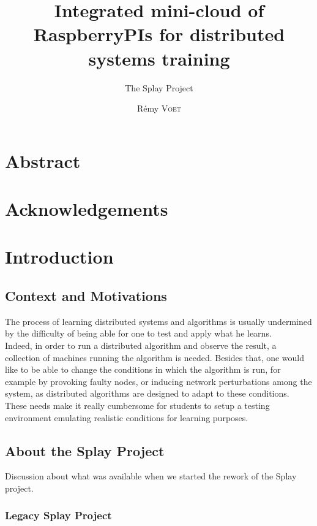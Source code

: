 \documentclass{eplmastersthesis}
\title{Integrated mini-cloud of RaspberryPIs for distributed systems training}
\subtitle{The Splay Project}
\author{Rémy \textsc{Voet}}
\begin{document}
  \maketitle

  \chapter*{Abstract}

  \chapter*{Acknowledgements}

  \tableofcontents

  \chapter{Introduction}

    \section{Context and Motivations}

      The process of learning distributed systems and algorithms is usually
      undermined by the difficulty of being able for one to test and apply
      what he learns.\\
      Indeed, in order to run a distributed algorithm and observe the result, a
      collection of machines running the algorithm is needed. Besides that,
      one would like to be able to change the conditions in which the algorithm
      is run, for example by provoking faulty nodes, or inducing network
      perturbations among the system, as distributed algorithms are designed to
      adapt to these conditions. These needs make it really cumbersome
      for students to setup a testing environment emulating realistic
      conditions for learning purposes.

    \section{About the Splay Project}

      Discussion about what was available when we started the rework of
      the Splay project.

      \subsection{Legacy Splay Project}
\end{document}
